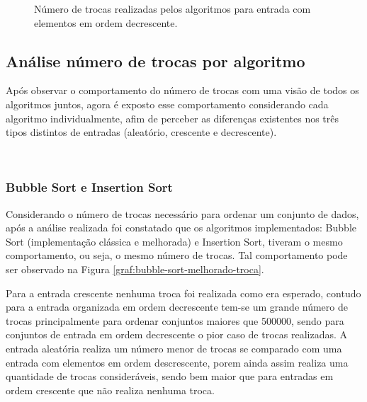 \documentclass[conference,onecolumn]{IEEEtran}
\begin{document}
\begin{figure}[H]
\begin{center}
\end{center}
\caption{Número de trocas realizadas pelos algoritmos para entrada com elementos em ordem decrescente.}
\label{graf:trocas-decrescente-menos}
\end{figure}

\subsection{Análise número de trocas por algoritmo}

Após observar o comportamento do número de trocas com uma visão de todos os algoritmos juntos, agora é exposto esse comportamento considerando cada algoritmo individualmente, afim de perceber as diferenças existentes nos três tipos distintos de entradas (aleatório, crescente e decrescente).

~\\
\subsubsection{Bubble Sort e Insertion Sort}

Considerando o número de trocas necessário para ordenar um conjunto de dados, após a análise realizada foi constatado que os algoritmos implementados: Bubble Sort (implementação clássica e melhorada) e Insertion Sort, tiveram o mesmo comportamento, ou seja, o mesmo número de trocas. Tal comportamento pode ser observado na Figura \ref{graf:bubble-sort-melhorado-troca}.

Para a entrada crescente nenhuma troca foi realizada como era esperado, contudo para a entrada organizada em ordem decrescente tem-se um grande número de trocas principalmente para ordenar conjuntos maiores que 500000, sendo para conjuntos de entrada em ordem decrescente o pior caso de trocas realizadas. A entrada aleatória realiza um número menor de trocas se comparado com uma entrada com elementos em ordem descrescente, porem ainda assim realiza uma quantidade de trocas consideráveis, sendo bem maior que para entradas em ordem crescente que não realiza nenhuma troca.
\end{document}
